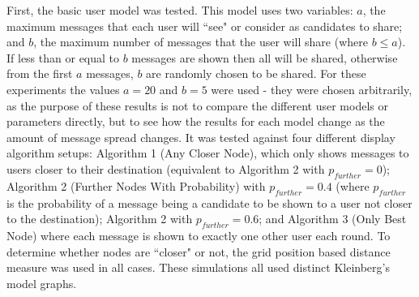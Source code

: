 \documentclass[bsc,frontabs,twoside,singlespacing,parskip,deptreport]{infthesis}     %
\begin{document}
First, the basic user model was tested. This model uses two variables: $a$, the maximum messages that each user will ``see" or consider as candidates to share; and $b$, the maximum number of messages that the user will share (where $b \leq a$). If less than or equal to $b$ messages are shown then all will be shared, otherwise from the first $a$ messages, $b$ are randomly chosen to be shared. For these experiments the values $a = 20$ and $b = 5$ were used - they were chosen arbitrarily, as the purpose of these results is not to compare the different user models or parameters directly, but to see how the results for each model change as the amount of message spread changes. It was tested against four different display algorithm setups: Algorithm 1 (Any Closer Node), which only shows messages to users closer to their destination (equivalent to Algorithm 2 with $p_{further}=0$); Algorithm 2 (Further Nodes With Probability) with $p_{further}=0.4$ (where $p_{further}$ is the probability of a message being a candidate to be shown to a user not closer to the destination); Algorithm 2 with $p_{further}=0.6$; and Algorithm 3 (Only Best Node) where each message is shown to exactly one other user each round. To determine whether nodes are ``closer" or not, the grid position based distance measure was used in all cases. These simulations all used distinct Kleinberg's model graphs.
\end{document}
